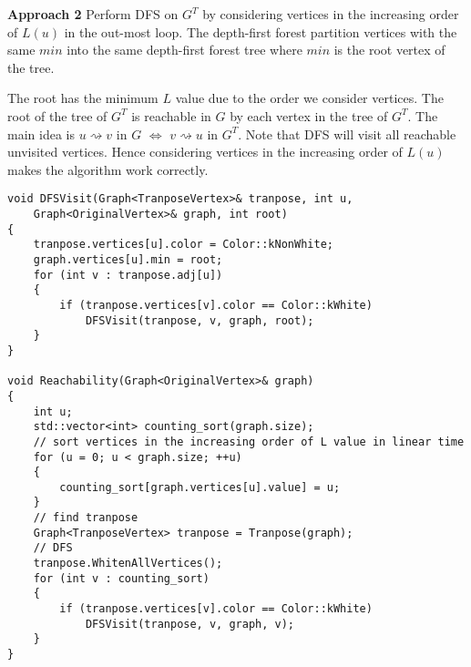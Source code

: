 \textbf{Approach 2}
Perform DFS on $G^T$ by considering vertices 
in the increasing order of $L(u)$ in the out-most loop.
The depth-first forest partition vertices with the same $min$
into the same depth-first forest tree where $min$ is the root
vertex of the tree.

The root has the minimum $L$ value due to the order we consider vertices.
The root of the tree of $G^T$ is reachable in $G$ by each vertex 
in the tree of $G^T$. 
The main idea is $u \rightsquigarrow v$ in $G$
$\Longleftrightarrow$
$v \rightsquigarrow u$ in $G^T$.
Note that DFS will visit all reachable unvisited vertices.
Hence considering vertices in the increasing order of $L(u)$
makes the algorithm work correctly.

\begin{verbatim}
void DFSVisit(Graph<TranposeVertex>& tranpose, int u, 
    Graph<OriginalVertex>& graph, int root)
{
    tranpose.vertices[u].color = Color::kNonWhite;
    graph.vertices[u].min = root;
    for (int v : tranpose.adj[u])
    {
        if (tranpose.vertices[v].color == Color::kWhite)
            DFSVisit(tranpose, v, graph, root);
    }
}

void Reachability(Graph<OriginalVertex>& graph)
{
    int u;
    std::vector<int> counting_sort(graph.size);
    // sort vertices in the increasing order of L value in linear time
    for (u = 0; u < graph.size; ++u)
    {
        counting_sort[graph.vertices[u].value] = u;
    }
    // find tranpose
    Graph<TranposeVertex> tranpose = Tranpose(graph);
    // DFS
    tranpose.WhitenAllVertices();
    for (int v : counting_sort)
    {
        if (tranpose.vertices[v].color == Color::kWhite)
            DFSVisit(tranpose, v, graph, v);
    }
}
\end{verbatim}

